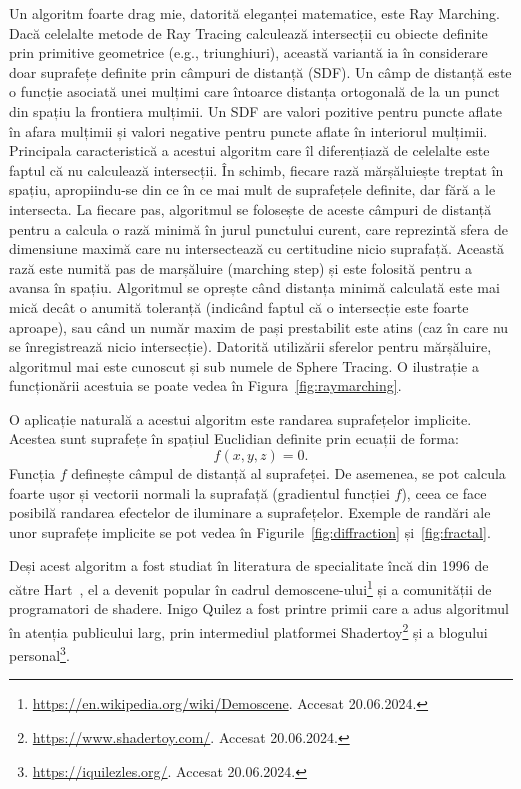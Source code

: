 \documentclass[12pt,a4paper]{report}
\numberwithin{equation}{section} %
\begin{document}
Un algoritm foarte drag mie, datorită eleganței matematice, este Ray Marching.
Dacă celelalte metode de Ray Tracing calculează intersecții cu obiecte definite
prin primitive geometrice (e.g., triunghiuri), această variantă ia în considerare
doar suprafețe definite prin câmpuri de distanță (SDF). Un câmp de distanță este
o funcție asociată unei mulțimi care întoarce distanța ortogonală de la un punct
din spațiu la frontiera mulțimii. Un SDF are valori pozitive pentru puncte aflate
în afara mulțimii și valori negative pentru puncte aflate în interiorul mulțimii.
Principala caracteristică a acestui algoritm
care îl diferențiază de celelalte este faptul că nu calculează intersecții.
În schimb, fiecare rază mărșăluiește treptat în spațiu, apropiindu-se din ce în ce mai mult
de suprafețele definite, dar fără a le intersecta.
La fiecare pas, algoritmul se folosește de aceste câmpuri de distanță pentru a
calcula o rază minimă în jurul punctului curent, care reprezintă sfera de dimensiune
maximă care nu intersectează cu certitudine nicio suprafață. Această rază este
numită pas de marșăluire (marching step) și este folosită pentru a avansa
în spațiu. Algoritmul se oprește când distanța minimă calculată este mai mică
decât o anumită toleranță (indicând faptul că o intersecție este foarte aproape),
sau când un număr maxim de pași prestabilit este atins (caz în care nu se înregistrează nicio intersecție).
Datorită utilizării sferelor pentru mărșăluire, algoritmul mai este cunoscut și
sub numele de Sphere Tracing.
O ilustrație a funcționării acestuia se poate vedea în Figura~\ref{fig:raymarching}.

O aplicație naturală a acestui algoritm este randarea suprafețelor implicite.
Acestea sunt suprafețe în spațiul Euclidian definite prin ecuații de forma:
\begin{equation}
	f(x, y, z) = 0.
\end{equation}
Funcția $f$ definește câmpul de distanță al suprafeței. De asemenea, se pot
calcula foarte ușor și vectorii normali la suprafață (gradientul funcției $f$),
ceea ce face posibilă randarea efectelor de iluminare a suprafețelor.
Exemple de randări ale unor suprafețe implicite se pot vedea în Figurile~\ref{fig:diffraction}
și~\ref{fig:fractal}.

Deși acest algoritm a fost studiat în literatura de specialitate încă din 1996 de către Hart~\cite{hart1996sphere},
el a devenit popular în cadrul demoscene-ului\footnote{\url{https://en.wikipedia.org/wiki/Demoscene}. Accesat 20.06.2024.}
și a comunității de programatori de shadere. Inigo Quilez a fost printre primii
care a adus algoritmul în atenția publicului larg, prin intermediul platformei
Shadertoy\footnote{\url{https://www.shadertoy.com/}. Accesat 20.06.2024.}
și a blogului personal\footnote{\url{https://iquilezles.org/}. Accesat 20.06.2024.}.
\end{document}
